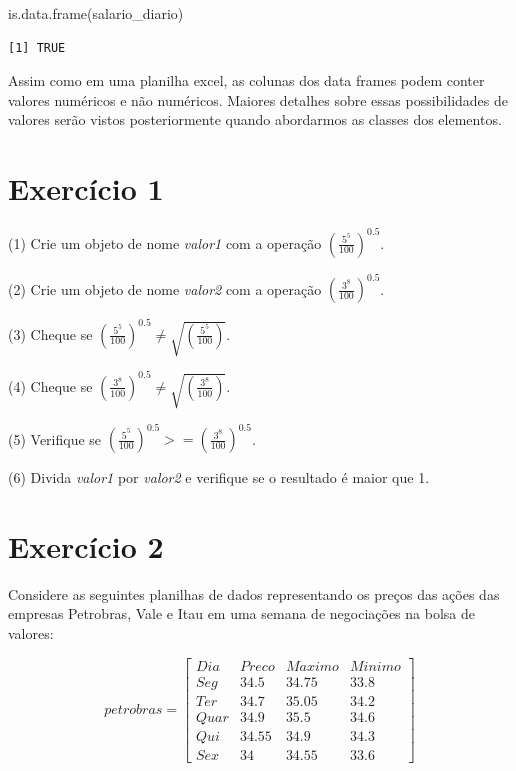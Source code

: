 \documentclass[
  letterpaper,
  DIV=11,
  numbers=noendperiod]{scrreprt}
\newenvironment{Shaded}{\begin{snugshade}}{\end{snugshade}}
\newcommand{\FunctionTok}[1]{\textcolor[rgb]{0.28,0.35,0.67}{#1}}
\newcommand{\NormalTok}[1]{\textcolor[rgb]{0.00,0.23,0.31}{#1}}
\begin{document}
\begin{Shaded}
\begin{Highlighting}[]
\FunctionTok{is.data.frame}\NormalTok{(salario\_diario)}
\end{Highlighting}
\end{Shaded}

\begin{verbatim}
[1] TRUE
\end{verbatim}

Assim como em uma planilha excel, as colunas dos data frames podem
conter valores numéricos e não numéricos. Maiores detalhes sobre essas
possibilidades de valores serão vistos posteriormente quando abordarmos
as classes dos elementos.

\section{Exercício 1}\label{exercuxedcio-1}

(1) Crie um objeto de nome \emph{valor1} com a operação
\(\left(\frac{5^5}{100}\right)^{0.5}\).

(2) Crie um objeto de nome \emph{valor2} com a operação
\(\left(\frac{3^8}{100}\right)^{0.5}\).

(3) Cheque se
\(\left(\frac{5^5}{100}\right)^{0.5} \neq \sqrt{\left(\frac{5^5}{100}\right)}\).

(4) Cheque se
\(\left(\frac{3^8}{100}\right)^{0.5} \neq \sqrt{\left(\frac{3^8}{100}\right)}\).

(5) Verifique se
\(\left(\frac{5^5}{100}\right)^{0.5}  >= \left(\frac{3^8}{100}\right)^{0.5}\).

(6) Divida \emph{valor1} por \emph{valor2} e verifique se o resultado é
maior que 1.

\section{Exercício 2}\label{exercuxedcio-2}

Considere as seguintes planilhas de dados representando os preços das
ações das empresas Petrobras, Vale e Itau em uma semana de negociações
na bolsa de valores:

\[
petrobras = \left[
\begin{array}{c|ccc}
Dia & Preco & Maximo & Minimo \\ \hline
Seg & 34.5 & 34.75 & 33.8\\
Ter & 34.7 & 35.05 & 34.2\\
Quar & 34.9 & 35.5 & 34.6\\
Qui & 34.55 & 34.9 & 34.3\\
Sex & 34 & 34.55 & 33.6
\end{array}
\right]
\]
\end{document}
